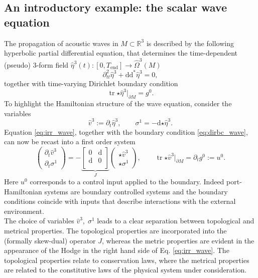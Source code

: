 \documentclass{elsarticle}
\renewcommand\d{\ensuremath{\mathrm{d}}}
\newcommand{\bbR}{\mathbb{R}}
\DeclareMathOperator{\tr}{tr}
\newcommand*{\dual}[1]{\ensuremath{\widehat{#1}}}
\begin{document}
{\subsection{An introductory example: the scalar wave equation}\label{sec:ex_wave}
The propagation of acoustic waves in $M\subset \bbR^3$ is described by the following hyperbolic partial differential equation, that determines the time-dependent (pseudo) $3$-form field $\dual{\eta}^3(t): [0, T_{\mathrm{end}}] \rightarrow \dual{\Omega}^3(M)$
\begin{equation}\label{eq:irr_wave}
    \partial_{tt}^2 \dual{\eta}^3 + \d \d^* \dual{\eta}^3 = 0,
\end{equation}
together with time-varying Dirichlet boundary condition
\begin{equation}\label{eq:dirbc_wave}
    \tr {\star \dual{\eta}^3}|_{\partial M} = g^0.
\end{equation}
To highlight the Hamiltonian structure of the wave equation, consider the variables
\begin{equation}
    \dual{v}^3 := \partial_t \dual{\eta}^3, \qquad \sigma^1 = -\d {\star \dual{\eta}^3}.
\end{equation}
Equation \eqref{eq:irr_wave}, together with the boundary condition \eqref{eq:dirbc_wave}, can now be recast into a first order system 
\begin{equation}\label{eq:mix_wave}
    \begin{pmatrix}
        \partial_t \dual{v}^3 \\
        \partial_t \sigma^1
    \end{pmatrix} = -\underbrace{\begin{bmatrix}
        0 & \d \\
        \d & 0 \\
    \end{bmatrix}}_{J}
    \begin{pmatrix}
        \star \dual{v}^3 \\
        \star \sigma^1
    \end{pmatrix}, \qquad \tr {\star \dual{v}^3}|_{\partial M} = \partial_t g^0:= u^0.
\end{equation}
Here $u^0$ corresponds to a control input applied to the boundary. Indeed port-Hamiltonian systems are boundary controlled systems and the boundary conditions coincide with inputs that describe interactions with the external environment. \\

The choice of variables $\dual{v}^3, \; \sigma^1$ leads to a clear separation between topological and metrical properties. The topological properties are incorporated into the (formally skew-dual) operator $J$, whereas the metric properties are evident in the appearance of the Hodge in the right hand side of Eq. \eqref{eq:irr_wave}. The topological properties relate to conservation laws, where the metrical properties are related to the constitutive laws of the physical system under consideration.

}
\end{document}
